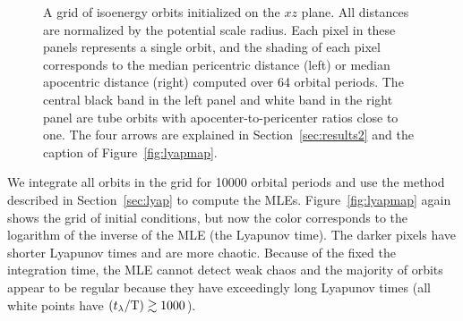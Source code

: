 \begin{figure}[h]%
\centering
\caption{ A grid of isoenergy orbits initialized on the $xz$ plane. All
distances are normalized by the potential scale radius. Each pixel in these
panels represents a single orbit, and the shading of each pixel corresponds to
the median pericentric distance (left) or median apocentric distance (right)
computed over 64 orbital periods. The central black band in the left panel and
white band in the right panel are tube orbits with apocenter-to-pericenter
ratios close to one. The four arrows are explained in Section~\ref{sec:results2}
and the caption of Figure~\ref{fig:lyapmap}.}
\label{fig:apoper}
\end{figure}

We integrate all orbits in the grid for 10000 orbital periods and use the method
described in Section~\ref{sec:lyap} to compute the MLEs.
Figure~\ref{fig:lyapmap} again shows the grid of initial conditions, but now the
color corresponds to the logarithm of the inverse of the MLE (the Lyapunov
time). The darker pixels have shorter Lyapunov times and are more chaotic.
Because of the fixed the integration time, the MLE cannot detect weak chaos and
the majority of orbits appear to be regular because they have exceedingly long
Lyapunov times (all white points have $(t_\lambda/{\rm T}) \gtrsim 1000$).

